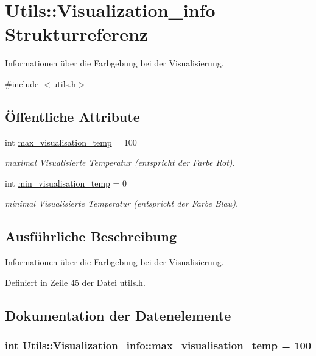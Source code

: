 \hypertarget{structUtils_1_1Visualization__info}{\section{Utils\-:\-:Visualization\-\_\-info Strukturreferenz}
\label{structUtils_1_1Visualization__info}
}


Informationen über die Farbgebung bei der Visualisierung.  




{\ttfamily \#include $<$utils.\-h$>$}

\subsection*{Öffentliche Attribute}
\begin{DoxyCompactItemize}
\item 
int \hyperlink{structUtils_1_1Visualization__info_a5327787a12634166ecc00f2224d3f39f}{max\-\_\-visualisation\-\_\-temp} = 100
\begin{DoxyCompactList}\small\item\em maximal Visualisierte Temperatur (entspricht der Farbe Rot). \end{DoxyCompactList}\item 
int \hyperlink{structUtils_1_1Visualization__info_a6e192352d1f00709f8ef963206ff2653}{min\-\_\-visualisation\-\_\-temp} = 0
\begin{DoxyCompactList}\small\item\em minimal Visualisierte Temperatur (entspricht der Farbe Blau). \end{DoxyCompactList}\end{DoxyCompactItemize}


\subsection{Ausführliche Beschreibung}
Informationen über die Farbgebung bei der Visualisierung. 

Definiert in Zeile 45 der Datei utils.\-h.



\subsection{Dokumentation der Datenelemente}
\hypertarget{structUtils_1_1Visualization__info_a5327787a12634166ecc00f2224d3f39f}{
\subsubsection[{max\-\_\-visualisation\-\_\-temp}]{\setlength{\rightskip}{0pt plus 5cm}int Utils\-::\-Visualization\-\_\-info\-::max\-\_\-visualisation\-\_\-temp = 100}}\label{structUtils_1_1Visualization__info_a5327787a12634166ecc00f2224d3f39f}



